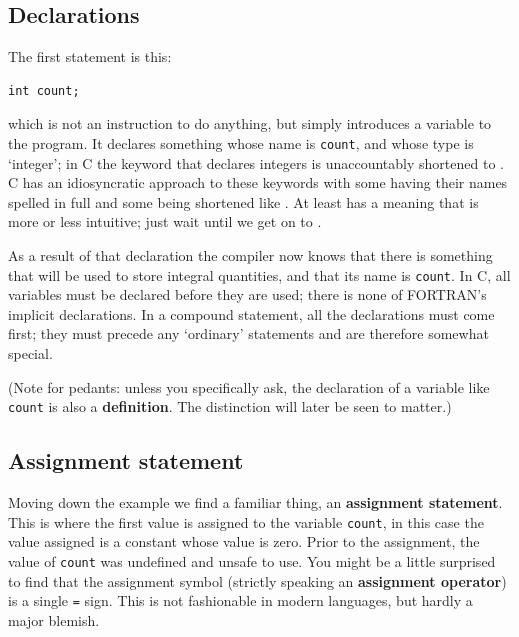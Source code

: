   

  \subsection{Declarations}
   

   The first statement is this:


   \begin{Verbatim}
int count;
\end{Verbatim}

   which is not an instruction to do anything, but simply introduces a
    variable to the program. It declares something whose name is
    \texttt{count}, and whose type is `integer'; in C the
    keyword that declares integers is unaccountably shortened to
    \kint. C has an idiosyncratic approach to these keywords with
    some having their names spelled in full and some being shortened like
    \kint. At least \kint{} has a meaning that is more or
    less intuitive; just wait until we get on to \static.


   As a result of that declaration the compiler now knows that there is
    something that will be used to store integral quantities, and that its name
    is \texttt{count}. In C, all variables must be declared before they are
    used; there is none of FORTRAN's implicit declarations. In a compound
    statement, all the declarations must come first; they must precede any
    `ordinary' statements and are therefore somewhat special.


   (Note for pedants: unless you specifically ask, the declaration of a
    variable like \texttt{count} is also a \textbf{definition}. The
    distinction will later be seen to matter.)


  

  \subsection{Assignment statement}
   

   Moving down the example we find a familiar thing, an \textbf{assignment
     statement}. This is where the first value is assigned to the variable
     \texttt{count}, in this case the value assigned is a constant whose
     value is zero. Prior to the assignment, the value of \texttt{count}
     was undefined and unsafe to use. You might be a little surprised to find
     that the assignment symbol (strictly speaking an \textbf{assignment
     operator}) is a single \texttt{=} sign. This is not fashionable
     in modern languages, but hardly a major blemish.



